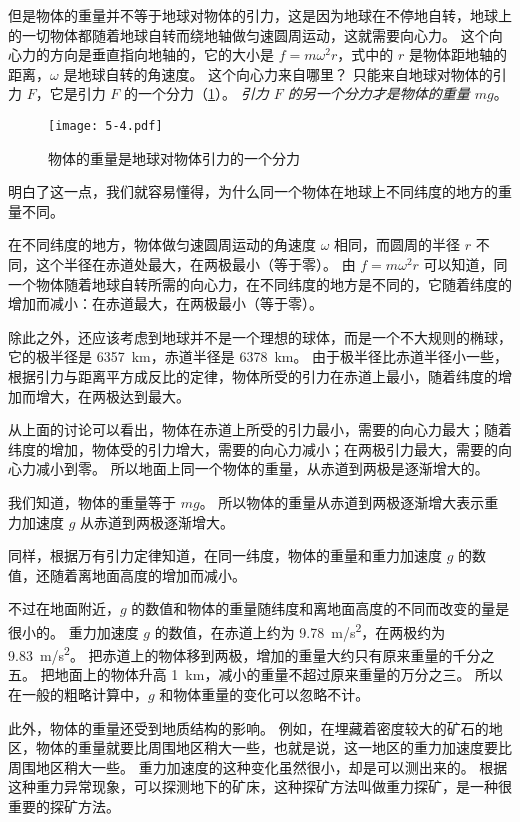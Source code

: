 \medskip
但是物体的重量并不等于地球对物体的引力，这是因为地球在不停地自转，地球上的一切物体都随着地球自转而绕地轴做匀速圆周运动，这就需要向心力。
这个向心力的方向是垂直指向地轴的，它的大小是 $f=m\omega^2r$，式中的 $r$ 是物体距地轴的距离，$\omega$ 是地球自转的角速度。
这个向心力来自哪里？
只能来自地球对物体的引力 $F$，它是引力 $F$ 的一个分力（\cref{fig:5-4}）。
\emph{引力 $F$ 的另一个分力才是物体的重量 $mg$}。
\begin{figure}
	\texttt{[image: 5-4.pdf]}
	\caption{物体的重量是地球对物体引力的一个分力}\label{fig:5-4}
\end{figure}

明白了这一点，我们就容易懂得，为什么同一个物体在地球上不同纬度的地方的重量不同。

在不同纬度的地方，物体做匀速圆周运动的角速度 $\omega$ 相同，而圆周的半径 $r$ 不同，这个半径在赤道处最大，在两极最小（等于零）。
由 $f=m\omega^2 r$ 可以知道，同一个物体随着地球自转所需的向心力，在不同纬度的地方是不同的，它随着纬度的增加而减小：在赤道最大，在两极最小（等于零）。

除此之外，还应该考虑到地球并不是一个理想的球体，而是一个不大规则的椭球，它的极半径是 \qty{6357}{km}，赤道半径是 \qty{6378}{km}。
由于极半径比赤道半径小一些，根据引力与距离平方成反比的定律，物体所受的引力在赤道上最小，随着纬度的增加而增大，在两极达到最大。

从上面的讨论可以看出，物体在赤道上所受的引力最小，需要的向心力最大；随着纬度的增加，物体受的引力增大，需要的向心力减小；在两极引力最大，需要的向心力减小到零。
所以地面上同一个物体的重量，从赤道到两极是逐渐增大的。

我们知道，物体的重量等于 $mg$。
所以物体的重量从赤道到两极逐渐增大表示重力加速度 $g$ 从赤道到两极逐渐增大。

同样，根据万有引力定律知道，在同一纬度，物体的重量和重力加速度 $g$ 的数值，还随着离地面高度的增加而减小。

不过在地面附近，$g$ 的数值和物体的重量随纬度和离地面高度的不同而改变的量是很小的。
重力加速度 $g$ 的数值，在赤道上约为 \qty{9.78}{m/s^2}，在两极约为 \qty{9.83}{m/s^2}。
把赤道上的物体移到两极，增加的重量大约只有原来重量的千分之五。
把地面上的物体升高 \qty{1}{km}，减小的重量不超过原来重量的万分之三。
所以在一般的粗略计算中，$g$ 和物体重量的变化可以忽略不计。

此外，物体的重量还受到地质结构的影响。
例如，在埋藏着密度较大的矿石的地区，物体的重量就要比周围地区稍大一些，也就是说，这一地区的重力加速度要比周围地区稍大一些。
重力加速度的这种变化虽然很小，却是可以测出来的。
根据这种重力异常现象，可以探测地下的矿床，这种探矿方法叫做重力探矿，是一种很重要的探矿方法。

